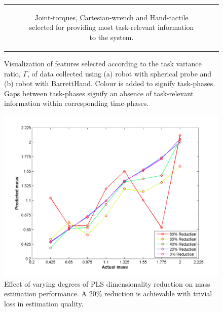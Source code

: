 \begin{figure}[]
\begin{center}
\begin{tabular}{c}
\begin{subfigure}[]{0.78\linewidth}
            \caption{Joint-torques, Cartesian-wrench and Hand-tactile selected for providing most task-relevant information to the system.}
            \label{fig:tvr_table_h}
        \end{subfigure}
    \end{tabular}
    \end{center}
    \caption{Visualization of features selected according to the task variance ratio, $\Gamma$, of data collected using (a) robot with spherical probe and (b) robot with BarrettHand. Colour is added to signify task-phases. Gaps between task-phases signify an absence of task-relevant information within corresponding time-phases.}
    \label{fig:tvr_tables}
\end{figure}

\begin{figure}[]
	\centering
	\includegraphics[width=\linewidth]{images/beta_reduc_comp}
	\caption{Effect of varying degrees of PLS dimensionality reduction on mass estimation performance. A 20\% reduction is achievable with trivial loss in estimation quality.}
	\label{fig:beta_reduc_comp}
\end{figure}

